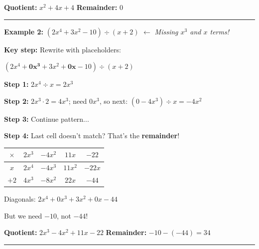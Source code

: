 \documentclass[11pt]{article}
\begin{document}
\vspace{0.1cm}
\textbf{Quotient:} $\boxed{x^2 + 4x + 4}$ \hspace{0.3in} \textbf{Remainder:} $\boxed{0}$

\vspace{0.2cm}
\hrule
\vspace{0.2cm}

\textbf{Example 2:} $(2x^4 + 3x^2 - 10) \div (x + 2)$ \hspace{0.3in} $\leftarrow$ \textit{Missing $x^3$ and $x$ terms!}

\vspace{0.1cm}
\begin{minipage}[t]{0.48\textwidth}
\textbf{Key step:} Rewrite with placeholders:

$(2x^4 + \mathbf{0x^3} + 3x^2 + \mathbf{0x} - 10) \div (x + 2)$

\vspace{0.1cm}
\textbf{Step 1:} $2x^4 \div x = 2x^3$

\textbf{Step 2:} $2x^3 \cdot 2 = 4x^3$; need $0x^3$, so next: $(0 - 4x^3) \div x = -4x^2$

\textbf{Step 3:} Continue pattern...

\textbf{Step 4:} Last cell doesn't match? That's the \textbf{remainder}!
\end{minipage}
\hfill
\begin{minipage}[t]{0.48\textwidth}
\centering
\renewcommand{\arraystretch}{1.4}
\begin{tabular}{|c||c|c|c|c|}
\hline
$\times$ & $2x^3$ & $-4x^2$ & $11x$ & $-22$ \\
\hline\hline
$x$ & $2x^4$ & $-4x^3$ & $11x^2$ & $-22x$ \\
\hline
$+2$ & $4x^3$ & $-8x^2$ & $22x$ & $-44$ \\
\hline
\end{tabular}

\vspace{0.15cm}
{\small Diagonals: $2x^4 + 0x^3 + 3x^2 + 0x - 44$}

{\small But we need $-10$, not $-44$!}
\end{minipage}

\vspace{0.1cm}
\textbf{Quotient:} $\boxed{2x^3 - 4x^2 + 11x - 22}$ \hspace{0.2in} \textbf{Remainder:} $-10 - (-44) = \boxed{34}$

\vspace{0.2cm}
\hrule
\vspace{0.2cm}
\end{document}
